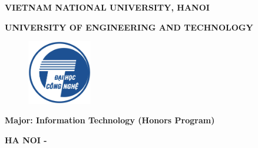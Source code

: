 \begin{titlepage}\adddecorativeborder
    \centering
    \vspace{1cm}
    {\large\textbf{VIETNAM NATIONAL UNIVERSITY, HANOI}\par}
    {\large\textbf{UNIVERSITY OF ENGINEERING AND TECHNOLOGY}\par}
    \vspace{1cm}

    \begin{figure}[H]
        \includegraphics[width=0.25\textwidth]{images/UET_logo.png}
        \centering
        \label{fig:uet_logo}
    \end{figure}

    {\Large\bfseries \AuthorName \par}

    \vspace{2cm}

    {\LARGE\bfseries\MakeUppercase{\ProjectNameEng} \par}

    \vspace{2cm}

    {\Large\bfseries Major: Information Technology (Honors Program)\par}

    \vspace{1.5cm}

    \vfill



    {\large\bfseries HA NOI - \the\year \par}
\end{titlepage}